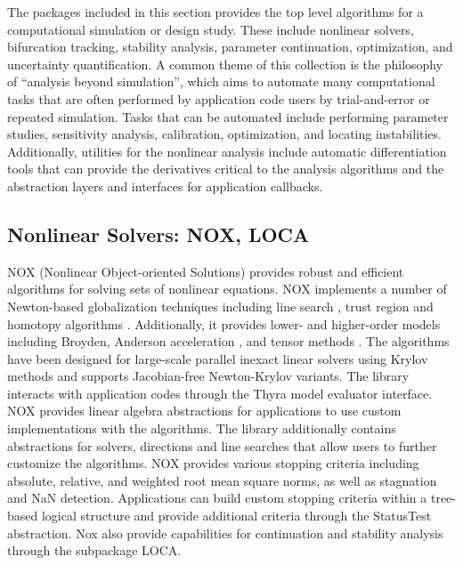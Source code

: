 
The packages included in this section provides the top level algorithms for a computational simulation or design study.
These include nonlinear solvers, bifurcation tracking, stability analysis, parameter continuation, optimization, and uncertainty quantification.
A common theme of this collection is the philosophy of ``analysis beyond simulation'', which aims to automate many computational tasks that are often performed by application code users by trial-and-error or repeated simulation. Tasks that can be automated include performing parameter studies, sensitivity analysis, calibration, optimization, and locating instabilities.
Additionally, utilities for the nonlinear analysis include automatic differentiation tools that can provide the derivatives critical to the analysis algorithms and the abstraction layers and interfaces for application callbacks.

\subsection{Nonlinear Solvers: NOX, LOCA} \label{sec:nox}
NOX (Nonlinear Object-oriented Solutions) provides robust and efficient algorithms for solving sets of nonlinear equations.
NOX implements a number of Newton-based globalization techniques including line search \cite{Pawlowski2006}, trust region \cite{Pawlowski2006,Pawlowski2008} and homotopy algorithms \cite{Coffey2003}.
Additionally, it provides lower- and higher-order models including Broyden, Anderson acceleration \cite{Walker2011}, and tensor methods \cite{Bader2005}.
The algorithms have been designed for large-scale parallel inexact linear solvers using Krylov methods and supports Jacobian-free Newton-Krylov variants.
The library interacts with application codes through the Thyra model evaluator interface.
NOX provides linear algebra abstractions for applications to use custom implementations with the algorithms.
The library additionally contains abstractions for solvers, directions and line searches that allow users to further customize the algorithms.
NOX provides various stopping criteria including absolute, relative, and weighted root mean square norms, as well as stagnation and NaN detection.
Applications can build custom stopping criteria within a tree-based logical structure and provide additional criteria through the StatusTest abstraction.
Nox also provide capabilities for continuation and stability analysis through the subpackage LOCA.

